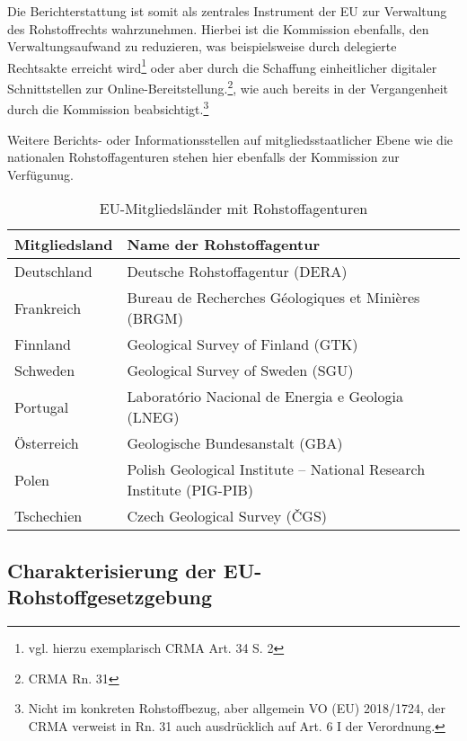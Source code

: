 \documentclass[12pt,a4paper,oneside]{book} %
\begin{document}
	Die Berichterstattung ist somit als zentrales Instrument der EU zur Verwaltung des Rohstoffrechts wahrzunehmen. Hierbei ist die Kommission ebenfalls, den Verwaltungsaufwand zu reduzieren, was beispielsweise durch delegierte Rechtsakte erreicht wird\footnote{vgl. hierzu exemplarisch CRMA Art. 34 S. 2} oder aber durch die Schaffung einheitlicher digitaler Schnittstellen zur Online-Bereitstellung.\footnote{CRMA Rn. 31}, wie auch bereits in der Vergangenheit durch die Kommission beabsichtigt.\footnote{Nicht im konkreten Rohstoffbezug, aber allgemein VO (EU) 2018/1724, der CRMA verweist in Rn. 31 auch ausdrücklich auf Art. 6 I der Verordnung.}
	
	Weitere Berichts- oder Informationsstellen auf mitgliedsstaatlicher Ebene wie die nationalen Rohstoffagenturen stehen hier ebenfalls der Kommission zur Verfügunug.
	\begin{table}[h!]
		\centering
		\begin{tabular}{|l|l|}
			\hline
			\textbf{Mitgliedsland} & \textbf{Name der Rohstoffagentur} \\ \hline
			Deutschland            & Deutsche Rohstoffagentur (DERA) \\ \hline
			Frankreich             & Bureau de Recherches Géologiques et Minières (BRGM) \\ \hline
			Finnland               & Geological Survey of Finland (GTK) \\ \hline
			Schweden               & Geological Survey of Sweden (SGU) \\ \hline
			Portugal               & Laboratório Nacional de Energia e Geologia (LNEG) \\ \hline
			Österreich             & Geologische Bundesanstalt (GBA) \\ \hline
			Polen                  & Polish Geological Institute – National Research Institute (PIG-PIB) \\ \hline
			Tschechien             & Czech Geological Survey (ČGS) \\ \hline
		\end{tabular}
		\caption{EU-Mitgliedsländer mit Rohstoffagenturen}
		\label{tab:rohstoffagenturen}
	\end{table}
	
	
\subsection{Charakterisierung der EU-Rohstoffgesetzgebung}
\end{document}
